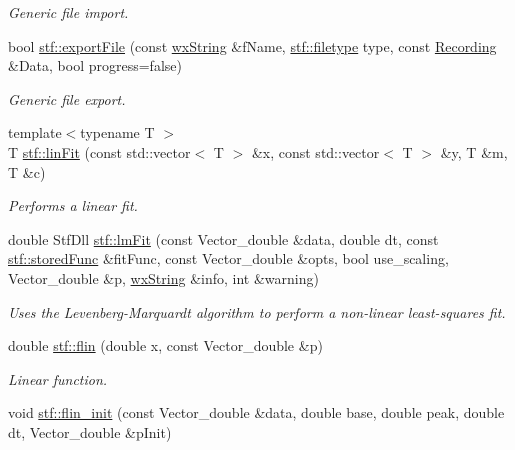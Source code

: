 \begin{DoxyCompactItemize}
\begin{DoxyCompactList}\small\item\em Generic file import. \item\end{DoxyCompactList}\item 
bool \hyperlink{group__stfgen_ga502a391afc11e955c34aa4a6efc208af}{stf::exportFile} (const \hyperlink{classwxString}{wxString} \&fName, \hyperlink{group__stfgen_gae703f7802498ae301ac058b94426900f}{stf::filetype} type, const \hyperlink{classRecording}{Recording} \&Data, bool progress=false)
\begin{DoxyCompactList}\small\item\em Generic file export. \item\end{DoxyCompactList}\item 
{\footnotesize template$<$typename T $>$ }\\T \hyperlink{group__stfgen_ga29e77fd36f4c103444287e9c5b807ab9}{stf::linFit} (const std::vector$<$ T $>$ \&x, const std::vector$<$ T $>$ \&y, T \&m, T \&c)
\begin{DoxyCompactList}\small\item\em Performs a linear fit. \item\end{DoxyCompactList}\item 
double StfDll \hyperlink{group__stfgen_gacf43d0ea16185a30745919255f231c80}{stf::lmFit} (const Vector\_\-double \&data, double dt, const \hyperlink{structstf_1_1storedFunc}{stf::storedFunc} \&fitFunc, const Vector\_\-double \&opts, bool use\_\-scaling, Vector\_\-double \&p, \hyperlink{classwxString}{wxString} \&info, int \&warning)
\begin{DoxyCompactList}\small\item\em Uses the Levenberg-\/Marquardt algorithm to perform a non-\/linear least-\/squares fit. \item\end{DoxyCompactList}\item 
double \hyperlink{group__stfgen_ga96ce124f20c81dcdac988e31770b65c5}{stf::flin} (double x, const Vector\_\-double \&p)
\begin{DoxyCompactList}\small\item\em Linear function. \item\end{DoxyCompactList}\item 
\hypertarget{group__stfgen_gacf47eaaf817ab9f675c36f1b77811fd9}{
void \hyperlink{group__stfgen_gacf47eaaf817ab9f675c36f1b77811fd9}{stf::flin\_\-init} (const Vector\_\-double \&data, double base, double peak, double dt, Vector\_\-double \&pInit)}
\label{group__stfgen_gacf47eaaf817ab9f675c36f1b77811fd9}


\end{DoxyCompactItemize}
